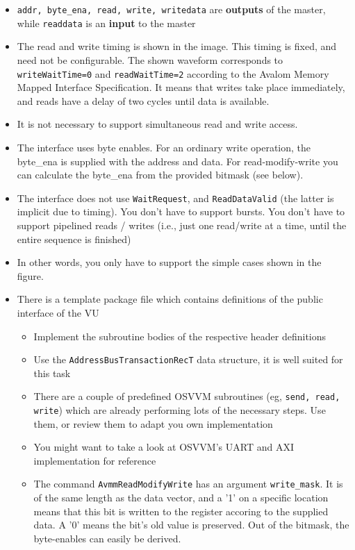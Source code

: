 \documentclass[12pt,epsf,makeidx,oneside]{book}
\begin{document}
  \begin{itemize}[noitemsep]
    \item {\tt addr, byte\_ena, read, write, writedata} are {\bf outputs} of the master, while {\tt readdata} is an {\bf input} to the master
    \item The read and write timing is shown in the image. This timing is fixed, and need not be configurable. The shown waveform corresponds to {\tt writeWaitTime=0} and {\tt readWaitTime=2} according to the Avalom Memory Mapped Interface Specification. It means that writes take place immediately, and reads have a delay of two cycles until data is available.
    \item It is not necessary to support simultaneous read and write access.
    \item The interface uses byte enables. For an ordinary write operation, the byte\_ena is supplied with the address and data. For read-modify-write you can calculate the byte\_ena from the provided bitmask (see below).
    \item The interface does not use {\tt WaitRequest}, and {\tt ReadDataValid} (the latter is implicit due to timing). You don't have to support bursts. You don't have to support pipelined reads / writes (i.e., just one read/write at a time, until the entire sequence is finished)
    \item In other words, you only have to support the simple cases shown in the figure.
    \item There is a template package file which contains definitions of the public interface of the VU
    \begin{itemize}[noitemsep]
      \item Implement the subroutine bodies of the respective header definitions
      \item Use the {\tt AddressBusTransactionRecT} data structure, it is well suited for this task
      \item There are a couple of predefined OSVVM subroutines (eg, {\tt send, read, write}) which are already performing 
            lots of the necessary steps. Use them, or review them to adapt you own implementation
      \item You might want to take a look at OSVVM's UART and AXI implementation for reference
      \item The command {\tt AvmmReadModifyWrite} has an argument {\tt write\_mask}. It is of the same length as the data vector, and a '1' on a specific location means
            that this bit is written to the register accoring to the supplied data. A '0' means the bit's old value is preserved. Out of the bitmask, the byte-enables can easily be derived.

\end{itemize}
\end{itemize}
\end{document}
